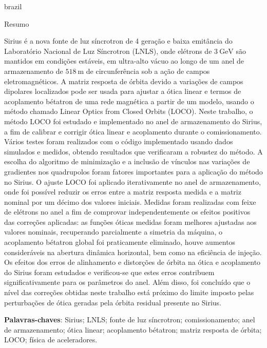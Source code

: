 \begin{otherlanguage*}{brazil}
\renewcommand{\sfdefault}{\rmdefault}
    \begin{center}{\ABNTEXchapterfont\huge Resumo}\end{center}
    
    Sirius é a nova fonte de luz síncrotron de 4 geração e baixa emitância do Laboratório Nacional de Luz Síncrotron (LNLS), onde elétrons de $\SI{3}{\giga\electronvolt}$ são mantidos em condições estáveis, em ultra-alto vácuo ao longo de um anel de armazenamento de $\SI{518}{\meter}$ de circunferência sob a ação de campos eletromagnéticos. A matriz resposta de órbita devido a variações de campos dipolares localizados pode ser usada para ajustar a ótica linear e termos de acoplamento bétatron de uma rede magnética a partir de um modelo, usando o método chamado Linear Optics from Closed Orbits (LOCO). Neste trabalho, o método LOCO foi estudado e implementado no anel de armazenamento do Sirius, a fim de calibrar e corrigir ótica linear e acoplamento durante o comissionamento. Vários testes foram realizados com o código implementado usando dados simulados e medidos, obtendo resultados que verificaram a robustez do método. A escolha do algoritmo de minimização e a inclusão de vínculos nas variações de gradientes nos quadrupolos foram fatores importantes para a aplicação do método no Sirius. O ajuste LOCO foi aplicado iterativamente no anel de armazenamento, onde foi possível reduzir os erros entre a matriz resposta medida e a matriz nominal por um décimo dos valores iniciais. Medidas foram realizadas com feixe de elétrons no anel a fim de comprovar independentemente os efeitos positivos das correções aplicadas: as funções óticas medidas foram melhores ajustadas aos valores nominais, recuperando parcialmente a simetria da máquina, o acoplamento bétatron global foi praticamente eliminado, houve aumentos consideráveis na abertura dinâmica horizontal, bem como na eficiência de injeção. Os efeitos dos erros de alinhamento e distorções de órbita na ótica e acoplamento do Sirius foram estudados e verificou-se que estes erros contribuem significativamente para os parâmetros do anel. Além disso, foi concluído que o nível das correções obtidas neste trabalho está próximo do limite imposto pelas perturbações de ótica geradas pela órbita residual presente no Sirius.
    
    \vspace{\onelineskip}
    \noindent\textbf{Palavras-chaves}: Sirius; LNLS; fonte de luz síncrotron; comissionamento; anel de armazenamento; ótica linear; acoplamento bétatron; matriz resposta de órbita; LOCO; física de aceleradores.
    \vspace{\fill}
\end{otherlanguage*}
\cleardoublepage

